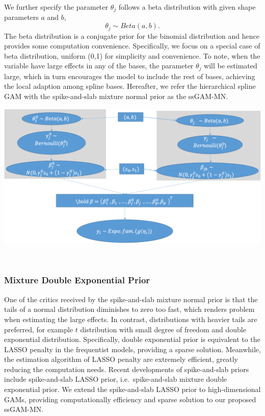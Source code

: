 \documentclass[AMA,STIX1COL,]{WileyNJD-v2}
\begin{document}
We further specify the parameter \(\theta_j\) follows a beta
distribution with given shape parameters \(a\) and \(b\), \[
\theta_j \sim Beta(a, b).
\] The beta distribution is a conjugate prior for the binomial
distribution and hence provides some computation convenience.
Specifically, we focus on a special case of beta distribution, uniform
(0,1) for simplicity and convenience. To note, when the variable have
large effects in any of the bases, the parameter \(\theta_j\) will be
estimated large, which in turn encourages the model to include the rest
of bases, achieving the local adaption among spline bases. Hereafter, we
refer the hierarchical spline GAM with the spike-and-slab mixture normal
prior as the ssGAM-MN.

\includegraphics{Fig/SS_prior_flow_chart.png}

~

\hypertarget{mixture-double-exponential-prior}{%
\subsubsection{Mixture Double Exponential
Prior}\label{mixture-double-exponential-prior}}

One of the critics received by the spike-and-slab mixture normal prior
is that the tails of a normal distribution diminishes to zero too fast,
which renders problem when estimating the large effects. In contrast,
distributions with heavier tails are preferred, for example \(t\)
distribution with small degree of freedom and double exponential
distribution. Specifically, double exponential prior is equivalent to
the LASSO penalty in the frequentist models, providing a sparse
solution. Meanwhile, the estimation algorithm of LASSO penalty are
extremely efficient, greatly reducing the computation needs. Recent
developments of spike-and-slab priors include spike-and-slab LASSO
prior, i.e.~spike-and-slab mixture double exponential prior. We extend
the spike-and-slab LASSO prior to high-dimensional GAMs, providing
computationally efficiency and sparse solution to our proposed ssGAM-MN.
\end{document}
